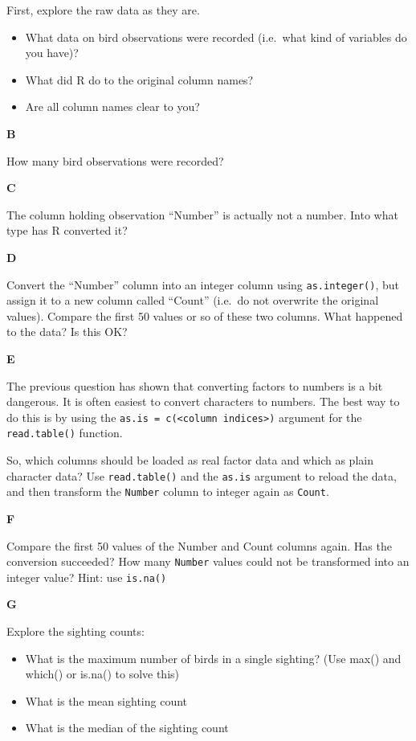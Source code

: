 \documentclass[]{book}
\providecommand{\tightlist}{%
  \setlength{\itemsep}{0pt}\setlength{\parskip}{0pt}}
\begin{document}
First, explore the raw data as they are.

\begin{itemize}
\tightlist
\item
  What data on bird observations were recorded (i.e.~what kind of variables do you have)?
\item
  What did R do to the original column names?
\item
  Are all column names clear to you?
\end{itemize}

\textbf{B}

How many bird observations were recorded?

\textbf{C}

The column holding observation ``Number'' is actually not a number. Into what type has R converted it?

\textbf{D}

Convert the ``Number'' column into an integer column using \texttt{as.integer()}, but assign it to a new column called ``Count'' (i.e.~do not overwrite the original values). Compare the first 50 values or so of these two columns. What happened to the data? Is this OK?

\textbf{E}

The previous question has shown that converting factors to numbers is a bit dangerous. It is often easiest to convert characters to numbers. The best way to do this is by using the \texttt{as.is\ =\ c(\textless{}column\ indices\textgreater{})} argument for the \texttt{read.table()} function.

So, which columns should be loaded as real factor data and which as plain character data? Use \texttt{read.table()} and the \texttt{as.is} argument to reload the data, and then transform the \texttt{Number} column to integer again as \texttt{Count}.

\textbf{F}

Compare the first 50 values of the Number and Count columns again. Has the conversion succeeded? How many \texttt{Number} values could not be transformed into an integer value? Hint: use \texttt{is.na()}

\textbf{G}

Explore the sighting counts:

\begin{itemize}
\tightlist
\item
  What is the maximum number of birds in a single sighting? (Use max() and which() or is.na() to solve this)
\item
  What is the mean sighting count
\item
  What is the median of the sighting count
\end{itemize}
\end{document}
